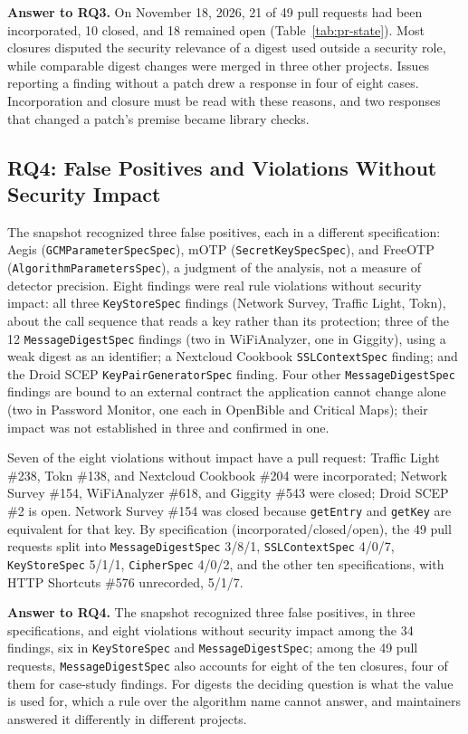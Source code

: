 \documentclass[conference]{IEEEtran}
\newcommand{\researchq}[1]{\textbf{RQ#1}}
\begin{document}
\textbf{Answer to \researchq{3}.} On November 18, 2026, 21 of 49 pull
requests had been incorporated, 10 closed, and 18 remained open
(Table~\ref{tab:pr-state}). Most closures disputed the security relevance of a
digest used outside a security role, while comparable digest changes were
merged in three other projects. Issues reporting a finding without a patch
drew a response in four of eight cases. Incorporation and closure must be read
with these reasons, and two responses that changed a patch's premise became
library checks.

\subsection{\researchq{4}: False Positives and Violations Without Security Impact}

The snapshot recognized three false positives, each in a different
specification: Aegis (\texttt{GCMParameterSpecSpec}), mOTP
(\texttt{SecretKeySpecSpec}), and FreeOTP (\texttt{AlgorithmParametersSpec}),
a judgment of the analysis, not a measure of detector precision. Eight
findings were real rule violations without security impact: all three
\texttt{KeyStoreSpec} findings (Network Survey, Traffic Light, Tokn), about
the call sequence that reads a key rather than its protection; three of the 12
\texttt{MessageDigestSpec} findings (two in WiFiAnalyzer, one in Giggity),
using a weak digest as an identifier; a Nextcloud Cookbook
\texttt{SSLContextSpec} finding; and the Droid SCEP
\texttt{KeyPairGeneratorSpec} finding. Four other \texttt{MessageDigestSpec}
findings are bound to an external contract the application cannot change alone
(two in Password Monitor, one each in OpenBible and Critical Maps); their
impact was not established in three and confirmed in one.

Seven of the eight violations without impact have a pull request: Traffic
Light \#238, Tokn \#138, and Nextcloud Cookbook \#204 were incorporated;
Network Survey \#154, WiFiAnalyzer \#618, and Giggity \#543 were closed; Droid
SCEP \#2 is open. Network Survey \#154 was closed because \texttt{getEntry}
and \texttt{getKey} are equivalent for that key. By specification (incorporated/closed/open), the 49 pull requests split into
\texttt{MessageDigestSpec} 3/8/1, \texttt{SSLContextSpec} 4/0/7,
\texttt{KeyStoreSpec} 5/1/1, \texttt{CipherSpec} 4/0/2, and the other ten
specifications, with HTTP Shortcuts \#576 unrecorded, 5/1/7.

\textbf{Answer to \researchq{4}.} The snapshot recognized three false
positives, in three specifications, and eight violations without security
impact among the 34 findings, six in \texttt{KeyStoreSpec} and
\texttt{MessageDigestSpec}; among the 49 pull requests,
\texttt{MessageDigestSpec} also accounts for eight of the ten closures, four of
them for case-study findings. For digests the
deciding question is what the value is used for, which a rule over the
algorithm name cannot answer, and maintainers answered it differently in
different projects.
\end{document}
